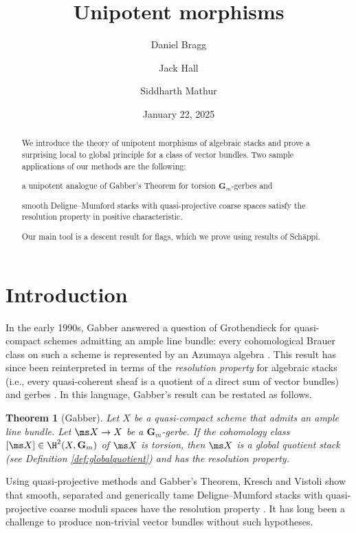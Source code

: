 \documentclass[reqno,a4paper]{amsart}
\title[Unipotent morphisms]{Unipotent morphisms}
\date{January 22, 2025}
\author{Daniel Bragg}
\author{Jack Hall}
\author{Siddharth Mathur}
\numberwithin{Theorem}{section}
\theoremstyle{plain}
\newtheorem*{theorem*}{Theorem}
\theoremstyle{remark}
\begin{document}
\maketitle
\begin{abstract}
  We introduce the theory of unipotent morphisms of algebraic stacks
  and prove a surprising local to global principle for a class of
  vector bundles. Two sample applications of our methods are the
  following:
  \begin{enumerate*}
  \item a unipotent analogue of Gabber's Theorem for torsion
    $\mathbf{G}_m$-gerbes and
  \item smooth Deligne--Mumford stacks with quasi-projective coarse
    spaces satisfy the resolution property in positive characteristic.
  \end{enumerate*}
  Our main tool is a descent result for flags, which we prove using
  results of Sch\"appi.
\end{abstract}

\section{Introduction}
In the early 1990s, Gabber answered a question of Grothendieck for
quasi-compact schemes admitting an ample line bundle: every
cohomological Brauer class on such a scheme is 
represented by an Azumaya algebra
\cite{MR611868,deJong_result-of-Gabber}. This result has since been reinterpreted in terms of the \emph{resolution property} for algebraic stacks (i.e., every quasi-coherent sheaf is a quotient of a direct sum of vector bundles) and gerbes \cite{MR1844577,MR2026412, MR2108211,2013arXiv1306.5418G,mathur2021resolution}.
In this language, Gabber's result can be restated as follows.
\begin{theorem*}[Gabber] \label{thm:gabber} Let $X$ be a quasi-compact
  scheme that admits an ample line bundle. Let $\ms X \to X$ be a
  $\mathbf{G}_m$-gerbe. If the cohomology class $[\ms X]\in\H^2(X,\mathbf{G}_m)$ of $\ms X$ is torsion, then $\ms X$ is a global quotient stack (see Definition \ref{def:globalquotient}) and has the resolution property.
\end{theorem*}
Using quasi-projective methods and Gabber's Theorem, Kresch and
Vistoli show that smooth, separated and generically tame
Deligne--Mumford stacks with quasi-projective coarse moduli spaces
have the resolution property \cite{MR2026412}. It has long been a challenge to produce non-trivial vector bundles without such hypotheses. 
\end{document}
